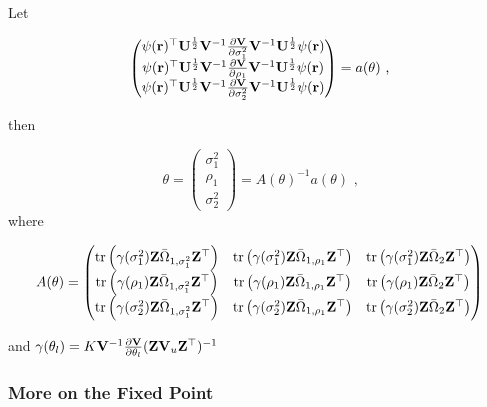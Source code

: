 Let

\[
\left(\begin{matrix}
\psi(\mathbf{r})^\top\mathbf{U}^{\frac{1}{2}}\mathbf{V}^{-1}\frac{\partial\mathbf{V}}{\partial\sigma_1^2}\mathbf{V}^{-1}\mathbf{U}^{\frac{1}{2}} \psi(\mathbf{r}) \\
\psi(\mathbf{r})^\top\mathbf{U}^{\frac{1}{2}}\mathbf{V}^{-1}\frac{\partial\mathbf{V}}{\partial\rho_1}\mathbf{V}^{-1}\mathbf{U}^{\frac{1}{2}} \psi(\mathbf{r}) \\
\psi(\mathbf{r})^\top\mathbf{U}^{\frac{1}{2}}\mathbf{V}^{-1}\frac{\partial\mathbf{V}}{\partial\sigma_2^2}\mathbf{V}^{-1}\mathbf{U}^{\frac{1}{2}} \psi(\mathbf{r})
\end{matrix}\right)
= a(\theta) \text{ ,}
\]

then

\[
\theta = \left(\begin{matrix}
\sigma_1^2 \\
\rho_1 \\
\sigma_2^2
\end{matrix}\right) = A(\theta)^{-1} a(\theta) \text{ ,}
\] where

\begin{align*}
A(\theta) = \left(\begin{matrix}
\operatorname{tr}\left(\gamma(\sigma_1^2) \mathbf{Z}\bar{\Omega}_{1,\sigma_1^2} \mathbf{Z}^\top \right) & \operatorname{tr}\left(\gamma(\sigma_1^2) \mathbf{Z}\bar{\Omega}_{1,\rho_1} \mathbf{Z}^\top \right) &
\operatorname{tr}\left(\gamma(\sigma_1^2) \mathbf{Z}\bar{\Omega}_2\mathbf{Z}^\top \right) \\
\operatorname{tr}\left(\gamma(\rho_1) \mathbf{Z}\bar{\Omega}_{1,\sigma_1^2} \mathbf{Z}^\top \right) & \operatorname{tr}\left(\gamma(\rho_1) \mathbf{Z}\bar{\Omega}_{1,\rho_1} \mathbf{Z}^\top \right) &
\operatorname{tr}\left(\gamma(\rho_1) \mathbf{Z}\bar{\Omega}_2\mathbf{Z}^\top \right) \\
\operatorname{tr}\left(\gamma(\sigma_2^2) \mathbf{Z}\bar{\Omega}_{1,\sigma_1^2} \mathbf{Z}^\top \right) & \operatorname{tr}\left(\gamma(\sigma_2^2) \mathbf{Z}\bar{\Omega}_{1,\rho_1} \mathbf{Z}^\top \right) &
\operatorname{tr}\left(\gamma(\sigma_2^2) \mathbf{Z}\bar{\Omega}_2\mathbf{Z}^\top \right)
\end{matrix}\right)
\end{align*}

and
$\gamma(\theta_l) = K\mathbf{V}^{-1}\frac{\partial\mathbf{V}}{\partial\theta_l} (\mathbf{Z}\mathbf{V}_u\mathbf{Z}^\top)^{-1}$

\subsubsection{More on the Fixed Point}\label{more-on-the-fixed-point}

